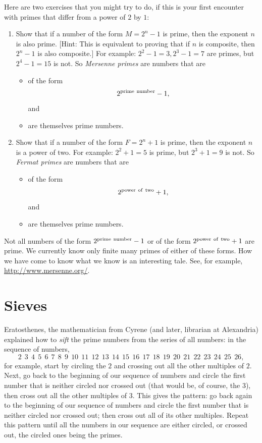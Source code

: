 \documentclass[openany]{book}
\newcommand{\ill}[3]{%
   \begin{figure}[H]%
   \vspace{-2ex}
   \centering%
   \texttt{[image: illustrations/\#1]}%
   \caption{#3}%
   \vspace{-2ex}
    \end{figure}}
\theoremstyle{plain}
\theoremstyle{definition}
\begin{document}
Here are two exercises that you might try to do, if this is your first
encounter with primes that differ from a power of $2$ by $1$:

\begin{enumerate}
\item Show that if a number of the form $M=2^n-1$ is prime, then the
  exponent $n$ is also prime. [Hint: This is equivalent to proving
  that if $n$ is composite, then $2^n-1$ is also composite.]
  For example: $ 2^2-1= 3, 2^3-1= 7$ are
  primes, but $2^4-1=15$ is not.  So {\it Mersenne primes} are numbers
  that are
  \begin{itemize}
    \item of the form $$2^{\rm prime\ number} -1,$$ and
    \item are themselves prime numbers.
  \end{itemize}

\item Show that if a number of the form $F=2^n+1$ is prime, then the
  exponent $n$ is a power of two.  For example: $ 2^2+1= 5$ is prime,
  but $2^3+1= 9$ is not.  So {\it Fermat primes} are numbers that
  are
  \begin{itemize}
     \item of the form $$2^{\rm power\ of\ two} +1,$$ and
     \item are themselves prime numbers.
  \end{itemize}
\end{enumerate}


Not all numbers of the form $2^{\rm prime\ number} -1$ or of the form
$2^{\rm power\ of\ two} +1$ are prime. We currently know only finite
many primes of either of these forms. How we have come to know what we
know is an interesting tale.  See, for example, \url{http://www.mersenne.org/}.


\chapter{Sieves}\label{ch:sieves}

Eratosthenes, the mathematician from Cyrene (and later, librarian at
Alexandria) explained how to {\em sift} the prime numbers from the
series of all numbers: in the sequence of numbers,
$$2\ \ 3\ \ 4 \ \ 5\ \ 6\ \ 7\ \ 8\ \ 9\ \ 10\ \ 11
\ \ 12\ \ 13\ \ 14\ \ 15\ \ 16\ \ 17\ \ 18\ \ 19\ \ 20\ \ 21\ \ 22\ \ 23\ \ 24\ \ 25\ \ 26,$$
for example, start by circling the $2$ and crossing out all the other
multiples of $2$.  Next, go back to the beginning of our sequence of
numbers and circle the first number that is neither circled nor
crossed out (that would be, of course, the $3$), then cross out all
the other multiples of $3$.  This gives the pattern: go back again to
the beginning of our sequence of numbers and circle the first number
that is neither circled nor crossed out; then cross out all of its
other multiples.  Repeat this pattern until all the numbers in our
sequence are either circled, or crossed out, the circled ones being
the primes.
\end{document}

